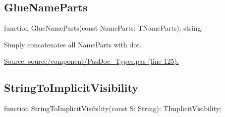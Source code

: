 \documentclass{report}
\newif\ifpdf
\begin{document}
\subsection*{GlueNameParts}
\fi
\label{PasDoc_Types-GlueNameParts}
\begin{list}{}{
\setlength{\itemindent}{0cm}
\setlength{\listparindent}{0cm}
\setlength{\leftmargin}{\evensidemargin}
\addtolength{\leftmargin}{\tmplength}
\settowidth{\labelsep}{X}
\addtolength{\leftmargin}{\labelsep}
\setlength{\labelwidth}{\tmplength}
}
\item[\textbf{Declaration}\hfill]
\ifpdf
\begin{flushleft}
\fi
\begin{ttfamily}
function GlueNameParts(const NameParts: TNameParts): string;\end{ttfamily}

\ifpdf
\end{flushleft}
\fi

\par
\item[\textbf{Description}]
Simply concatenates all NameParts with dot.\par
\href{https://github.com/pasdoc/pasdoc/blob/master/source/component/PasDoc_Types.pas#L125}{Source: source/component/PasDoc{\_}Types.pas (line 125).}

\end{list}
\ifpdf
\subsection*{\large{\textbf{StringToImplicitVisibility}}\normalsize\hspace{1ex}\hrulefill}
\else
\subsection*{StringToImplicitVisibility}
\fi
\label{PasDoc_Types-StringToImplicitVisibility}
\begin{list}{}{
\setlength{\itemindent}{0cm}
\setlength{\listparindent}{0cm}
\setlength{\leftmargin}{\evensidemargin}
\addtolength{\leftmargin}{\tmplength}
\settowidth{\labelsep}{X}
\addtolength{\leftmargin}{\labelsep}
\setlength{\labelwidth}{\tmplength}
}
\item[\textbf{Declaration}\hfill]
\ifpdf
\begin{flushleft}
\fi
\begin{ttfamily}
function StringToImplicitVisibility(const S: String): TImplicitVisibility;\end{ttfamily}

\ifpdf
\end{flushleft}
\fi

\end{list}
\end{document}
